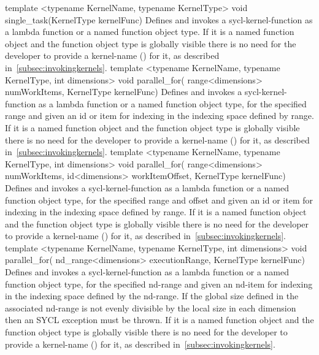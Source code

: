    \addRowTwoL
    {template <typename KernelName, typename KernelType>}
    {void single_task(KernelType kernelFunc)}
    {
      Defines and invokes a \gls{sycl-kernel-function} as a lambda function
      or a named function object type.
      If it is a named function object and the function object type is globally
      visible there is no need for the developer
      to provide a \gls{kernel-name} () for it,
      as described in~\ref{subsec:invokingkernels}.
    }
   \addRowThreeL
    {template <typename KernelName, typename KernelType, int dimensions>}
    {void parallel_for(}
    {range<dimensions> numWorkItems, KernelType kernelFunc)}
    {
      Defines and invokes a \gls{sycl-kernel-function} as a lambda function
      or a named function object type,
      for the specified range and given an id or item for indexing in the
      indexing space defined by range.
      If it is a named function object and the function object type is globally
      visible there is no need for the developer
      to provide a \gls{kernel-name} () for it,
      as described in~\ref{subsec:invokingkernels}.
    }
    \addRowFourL
    {template <typename KernelName, typename KernelType, int dimensions>}
    {void parallel_for(}
    { range<dimensions> numWorkItems,}
    { id<dimensions> workItemOffset, KernelType kernelFunc)}
    {
      Defines and invokes a \gls{sycl-kernel-function} as a lambda function
      or a named function object type,
      for the specified range and offset and given an id or item for indexing in
      the indexing space defined by range.
      If it is a named function object and the function object type is globally
      visible there is no need for the developer
      to provide a \gls{kernel-name} () for it,
      as described in~\ref{subsec:invokingkernels}.
    }
  \addRowThreeL
    {template <typename KernelName, typename KernelType, int dimensions>}
    {void parallel_for(}
    {nd_range<dimensions> executionRange, KernelType kernelFunc)}
    {
      Defines and invokes a \gls{sycl-kernel-function} as a lambda function
      or a named function object type,
      for the specified \gls{nd-range} and given an \gls{nd-item}
      for indexing in the indexing space defined by the \gls{nd-range}. If the
      global size defined in the associated \gls{nd-range} is not evenly divisible
      by the local size in each dimension then an  SYCL exception
      must be thrown.
      If it is a named function object and the function object type is globally
      visible there is no need for the developer
      to provide a \gls{kernel-name} () for it,
      as described in~\ref{subsec:invokingkernels}.
    }
